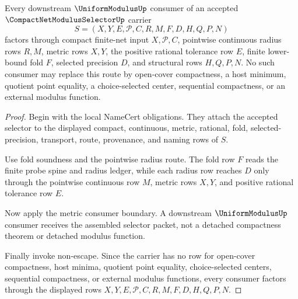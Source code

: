 \begin{theorem}
\label{thm:compact-net-modulus-selector-consumer-factorization}
Every downstream $\UniformModulusUp$ consumer of an accepted $\CompactNetModulusSelectorUp$ carrier
$$
S=(X,Y,E,\mathcal{P},C,R,M,F,D,H,Q,P,N)
$$
factors through compact finite-net input $X,\mathcal{P},C$, pointwise continuous radius rows $R,M$, metric rows $X,Y$, the positive rational tolerance row $E$, finite lower-bound fold $F$, selected precision $D$, and structural rows $H,Q,P,N$. No such consumer may replace this route by open-cover compactness, a host minimum, quotient point equality, a choice-selected center, sequential compactness, or an external modulus function.
\end{theorem}
\begin{proof}
Begin with the local NameCert obligations. They attach the accepted selector to the displayed compact, continuous, metric, rational, fold, selected-precision, transport, route, provenance, and naming rows of $S$.

Use fold soundness and the pointwise radius route. The fold row $F$ reads the finite probe spine and radius ledger, while each radius row reaches $D$ only through the pointwise continuous row $M$, metric rows $X,Y$, and positive rational tolerance row $E$.

Now apply the metric consumer boundary. A downstream $\UniformModulusUp$ consumer receives the assembled selector packet, not a detached compactness theorem or detached modulus function.

Finally invoke non-escape. Since the carrier has no row for open-cover compactness, host minima, quotient point equality, choice-selected centers, sequential compactness, or external modulus functions, every consumer factors through the displayed rows $X,Y,E,\mathcal{P},C,R,M,F,D,H,Q,P,N$.
\end{proof}

